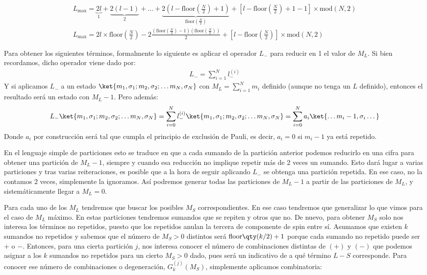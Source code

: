 \begin{align}
   L_\text{max} =\underbrace{2l}_{1} + \underbrace{2(l-1)}_{2}+\ldots+\underbrace{2\left(l-\text{floor}(\frac{N}{2})+1 \right)}_{\text{floor}\left(\frac{N}{2}\right) }+\left[l-\text{floor}\left(\frac{N}{2}\right)+1-1\right]\times \text{mod}(N,2)\\
   L_\text{max} = 2l\times \text{floor}\left(\frac{N}{2}\right)-2\frac{\left(\text{floor}\left(\frac{N}{2}\right)-1\right)\left(\text{floor}\left(\frac{N}{2}\right)\right)}{2}+\left[l-\text{floor}\left(\frac{N}{2}\right)\right]\times \text{mod}(N,2)   
 \end{align}

Para obtener los siguientes términos, formalmente lo siguiente es aplicar el operador $L_{-}$ para reducir en 1 el valor de $M_{L}$. Si bien recordamos, dicho operador viene dado por: 
\begin{align*}
L_{-} = \sum_{i=1}^{N} l_{-}^{(i)}
\end{align*}
Y si aplicamos $L_{-}$ a un estado $\ket{m_{1},\sigma_{1}; m_{2},\sigma_{2}; \dots m_{N},\sigma_{N}}$ con $M_{L} = \sum_{i=1}^{N} m_{i}$ definido (aunque no tenga un $L$ definido), entonces el resultado será un estado con $M_{L} - 1$. Pero además: 
\begin{align*}
L_{-} \ket{m_{1},\sigma_{1}; m_{2},\sigma_{2}; \dots m_{N},\sigma_{N}} = \sum_{i=0}^{N} l_{-}^{(i)} \ket{m_{1},\sigma_{1}; m_{2},\sigma_{2}; \dots m_{N},\sigma_{N}} = \sum_{i=0}^{N} a_{i} \ket{\dots m_{i} - 1, \sigma_{i} \dots}
\end{align*}
Donde $a_{i}$ por construcción será tal que cumpla el principio de exclusión de Pauli, es decir, $a_{i} = 0$ si $m_{i} - 1$ ya está repetido. \par 
En el lenguaje simple de particiones esto se traduce en que a cada sumando de la partición anterior podemos reducirlo en una cifra para obtener una partición de $M_{L}-1$, siempre y cuando esa reducción no implique repetir más de 2 veces un sumando. Esto dará lugar a varias particiones y tras varias reiteraciones, es posible que a la hora de seguir aplicando $L_{-}$ se obtenga una partición repetida. En ese caso, no la contamos 2 veces, simplemente la ignoramos. Así podremos generar todas las particiones de $M_{L}-1$ a partir de las particiones de $M_{L}$, y sistemáticamente llegar a $M_{L} = 0$. \par 
Para cada uno de los $M_{L}$ tendremos que buscar los posibles $M_{S}$ correspondientes. En ese caso tendremos que generalizar lo que vimos para el caso de $M_{L}$ máximo. En estas particiones tendremos sumandos que se repiten y otros que no. De nuevo, para obtener $M_{S}$ solo nos interesa los términos no repetidos, puesto que los repetidos anulan la tercera de componente de spin entre sí. Asumamos que existen $k$ sumandos no repetidos y sabemos que el número de $M_{S}>0$ distintos será $\mathrm{floor}\qty(k/2) + 1$ porque cada sumando no repetido puede ser $+$ o $-$. Entonces, para una cierta partición $j$, nos interesa conocer el número de combinaciones distintas de $(+)$ y $(-)$ que podemos asignar a los $k$ sumandos no repetidos para un cierto $M_{S}>0$ dado, pues será un indicativo de a qué término $L-S$ corresponde. Para conocer ese número de combinaciones o degeneración, $G^{(j)}_{k}(M_{S})$, simplemente aplicamos combinatoria: 

